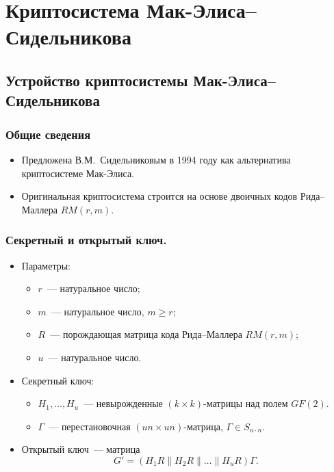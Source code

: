 
\section{Криптосистема Мак-Элиса--Сидельникова }

\subsection[Устройство]{Устройство криптосистемы Мак-Элиса--Сидельникова}

\begin{frame}
  \frametitle{Общие сведения}
\begin{itemize}
  \item Предложена В.М.~Сидельниковым в 1994 году как альтернатива криптосистеме Мак-Элиса.
  \pause
  \item Оригинальная криптосистема строится на основе двоичных кодов Рида--Маллера $RM(r,m)$.
  \end{itemize}

\end{frame}

\begin{frame}
  \frametitle{Секретный и открытый ключ.}
\begin{itemize}
  \item Параметры:
  \begin{itemize}
    \item
      $r$~--- натуральное число;
    \item
      $m$~--- натуральное число, $m\geqslant r$;
   \item $R$~--- порождающая матрица кода Рида--Маллера $RM(r,m)$;
   \item $u$~--- натуральное число.
    \end{itemize}
    \pause
  \item Секретный ключ:
    \begin{itemize}
    \item
      $H_1,\ldots,H_u$~--- невырожденные $(k\times k)$-матрицы над полем $GF(2)$.
    \item
      $\Gamma$~--- перестановочная $(un\times un)$-матрица, $\Gamma\in S_{u\cdot n}$.
    \end{itemize}
    \pause
  \item
    Открытый ключ~--- матрица
    $$G'=(H_1R\|H_2R\|\ldots\|H_uR)\Gamma.$$
  \end{itemize}

\end{frame}


